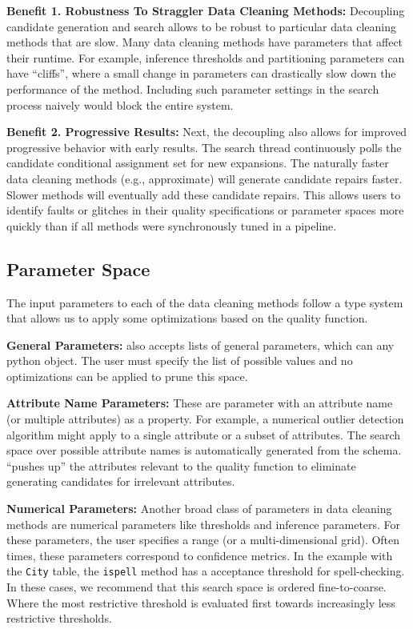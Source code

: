 \vspace{0.5em} \noindent \textbf{Benefit 1. Robustness To Straggler Data Cleaning Methods: } Decoupling candidate generation and search allows \sys to be robust to particular data cleaning methods that are slow. Many data cleaning methods have parameters that affect their runtime. For example, inference thresholds and partitioning parameters can have ``cliffs'', where a small change in parameters can drastically slow down the performance of the method. Including such parameter settings in the search process naively would block the entire system.

\vspace{0.5em} \noindent \textbf{Benefit 2. Progressive Results: } Next, the decoupling also allows for improved progressive behavior with early results. The search thread continuously polls the candidate conditional assignment set for new expansions. The naturally faster  data cleaning methods (e.g., approximate) will generate candidate repairs faster. Slower methods will eventually add these candidate repairs. This allows users to identify faults or glitches in their quality specifications or parameter spaces more quickly than if all methods were synchronously tuned in a pipeline.

\subsection{Parameter Space}
The input parameters to each of the data cleaning methods follow a type system that allows us to apply some optimizations based on the quality function.

\noindent \textbf{General Parameters: } \sys also accepts lists of general parameters, which can any python object. The user must specify the list of possible values and no optimizations can be applied to prune this space.

\noindent \textbf{Attribute Name Parameters: } These are parameter with an attribute name (or multiple attributes) as a property. For example, a numerical outlier detection algorithm might apply to a single attribute or a subset of attributes. The search space over possible attribute names is automatically generated from the schema. \sys ``pushes up'' the attributes relevant to the quality function to eliminate generating candidates for irrelevant attributes. 

\noindent \textbf{Numerical Parameters: } Another broad class of parameters in data cleaning methods are numerical parameters like thresholds and inference parameters. For these parameters, the user specifies a range (or a multi-dimensional grid). Often times, these parameters correspond to confidence metrics. In the example with the \texttt{City} table, the \texttt{ispell} method has a acceptance threshold for spell-checking. In these cases, we recommend that this search space is ordered fine-to-coarse. Where the most restrictive threshold is evaluated first towards increasingly less restrictive thresholds. 

